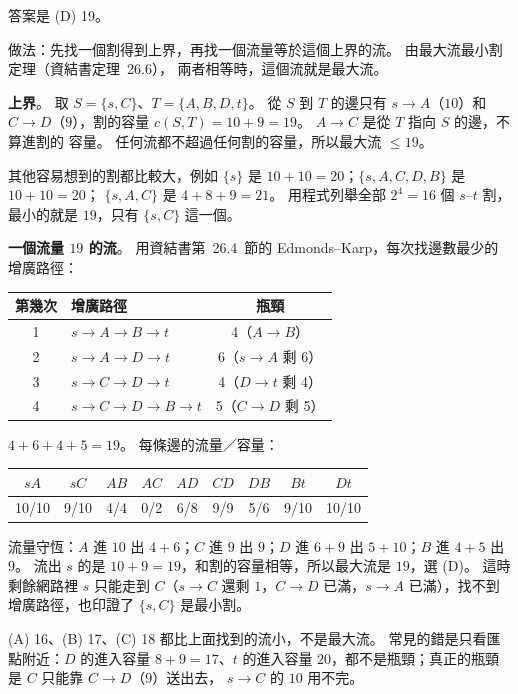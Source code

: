 \begin{pastsoln}
答案是 (D) 19。

做法：先找一個割得到上界，再找一個流量等於這個上界的流。 由最大流最小割定理（資結書定理~26.6），
兩者相等時，這個流就是最大流。

\textbf{上界}。 取 $S = \{s, C\}$、$T = \{A, B, D, t\}$。 從 $S$ 到 $T$ 的邊只有 $s \to A$（$10$）和
$C \to D$（$9$），割的容量 $c(S, T) = 10 + 9 = 19$。 $A \to C$ 是從 $T$ 指向 $S$ 的邊，不算進割的
容量。 任何流都不超過任何割的容量，所以最大流 $\le 19$。

其他容易想到的割都比較大，例如 $\{s\}$ 是 $10 + 10 = 20$；$\{s, A, C, D, B\}$ 是 $10 + 10 = 20$；
$\{s, A, C\}$ 是 $4 + 8 + 9 = 21$。 用程式列舉全部 $2^4 = 16$ 個 $s$--$t$ 割，最小的就是 $19$，只有
$\{s, C\}$ 這一個。

\textbf{一個流量 $19$ 的流}。 用資結書第~26.4~節的 Edmonds--Karp，每次找邊數最少的增廣路徑：
\begin{center}
\begin{tabular}{clc}
\toprule
第幾次 & 增廣路徑 & 瓶頸 \\
\midrule
1 & $s \to A \to B \to t$ & 4（$A \to B$） \\
2 & $s \to A \to D \to t$ & 6（$s \to A$ 剩 6） \\
3 & $s \to C \to D \to t$ & 4（$D \to t$ 剩 4） \\
4 & $s \to C \to D \to B \to t$ & 5（$C \to D$ 剩 5） \\
\bottomrule
\end{tabular}
\end{center}
$4 + 6 + 4 + 5 = 19$。 每條邊的流量／容量：
\begin{center}
\begin{tabular}{*{9}{c}}
\toprule
$s A$ & $s C$ & $A B$ & $A C$ & $A D$ & $C D$ & $D B$ & $B t$ & $D t$ \\
\midrule
10/10 & 9/10 & 4/4 & 0/2 & 6/8 & 9/9 & 5/6 & 9/10 & 10/10 \\
\bottomrule
\end{tabular}
\end{center}
流量守恆：$A$ 進 $10$ 出 $4 + 6$；$C$ 進 $9$ 出 $9$；$D$ 進 $6 + 9$ 出 $5 + 10$；$B$ 進 $4 + 5$
出 $9$。 流出 $s$ 的是 $10 + 9 = 19$，和割的容量相等，所以最大流是 $19$，選 (D)。 這時剩餘網路裡
$s$ 只能走到 $C$（$s \to C$ 還剩 $1$，$C \to D$ 已滿，$s \to A$ 已滿），找不到增廣路徑，也印證了
$\{s, C\}$ 是最小割。

(A) 16、(B) 17、(C) 18 都比上面找到的流小，不是最大流。 常見的錯是只看匯點附近：$D$ 的進入容量
$8 + 9 = 17$、$t$ 的進入容量 $20$，都不是瓶頸；真正的瓶頸是 $C$ 只能靠 $C \to D$（$9$）送出去，
$s \to C$ 的 $10$ 用不完。
\end{pastsoln}
